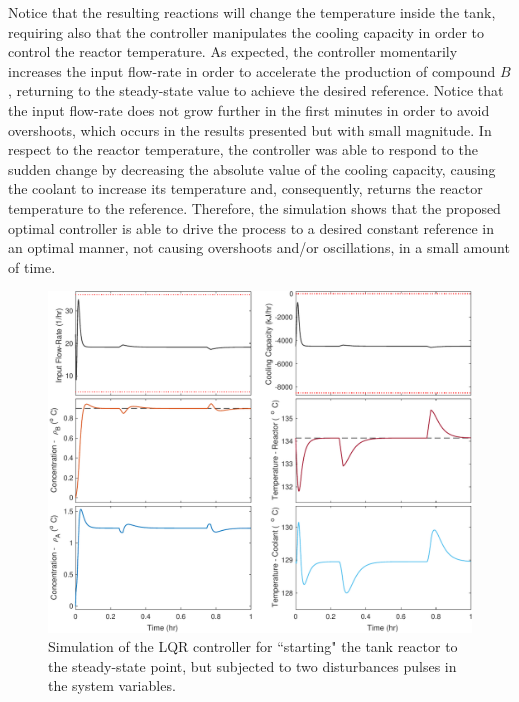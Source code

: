 \documentclass[a4paper,11pt]{book}
\numberwithin{figure}{chapter}
\numberwithin{equation}{chapter}
\numberwithin{table}{chapter}
\theoremstyle{definition}
\begin{document}
Notice that the resulting reactions will change the temperature inside the tank, requiring also that the controller manipulates the cooling capacity in order to control the reactor temperature. As expected, the controller momentarily increases the input flow-rate in order to accelerate the production of compound $B$, returning to the steady-state value to achieve the desired reference. Notice that the input flow-rate does not grow further in the first minutes in order to avoid overshoots, which occurs in the results presented but with small magnitude. In respect to the reactor temperature, the controller was able to respond to the sudden change by decreasing the absolute value of the cooling capacity, causing the coolant to increase its temperature and, consequently, returns the reactor temperature to the reference. Therefore, the simulation shows that the proposed optimal controller is able to drive the process to a desired constant reference in an optimal manner, not causing overshoots and/or oscillations, in a small amount of time.

\begin{figure}[ht] \centering
	\includegraphics[width=\textwidth]{chapter7/lqr02}
	
	\caption{Simulation of the LQR controller for ``starting" the tank reactor to the steady-state point, but subjected to two disturbances pulses in the system variables.}
	\label{fig:lqr02}
\end{figure}	
\end{document}
